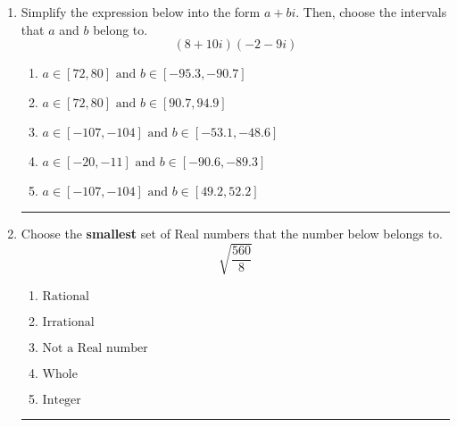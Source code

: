 \documentclass[14pt]{extbook}
\newcommand{\litem}[1]{\item#1\hspace*{-1cm}\rule{\textwidth}{0.4pt}}
\begin{document}
\begin{enumerate}
{\begin{enumerate}[label=\Alph*.]
\end{enumerate} }
\litem{
Simplify the expression below into the form $a+bi$. Then, choose the intervals that $a$ and $b$ belong to.\[ (8 + 10 i)(-2 - 9 i) \]\begin{enumerate}[label=\Alph*.]
\item \( a \in [72, 80] \text{ and } b \in [-95.3, -90.7] \)
\item \( a \in [72, 80] \text{ and } b \in [90.7, 94.9] \)
\item \( a \in [-107, -104] \text{ and } b \in [-53.1, -48.6] \)
\item \( a \in [-20, -11] \text{ and } b \in [-90.6, -89.3] \)
\item \( a \in [-107, -104] \text{ and } b \in [49.2, 52.2] \)

\end{enumerate} }
\litem{
Choose the \textbf{smallest} set of Real numbers that the number below belongs to.\[ \sqrt{\frac{560}{8}} \]\begin{enumerate}[label=\Alph*.]
\item \( \text{Rational} \)
\item \( \text{Irrational} \)
\item \( \text{Not a Real number} \)
\item \( \text{Whole} \)
\item \( \text{Integer} \)

\end{enumerate} }
\end{enumerate}
\end{document}
